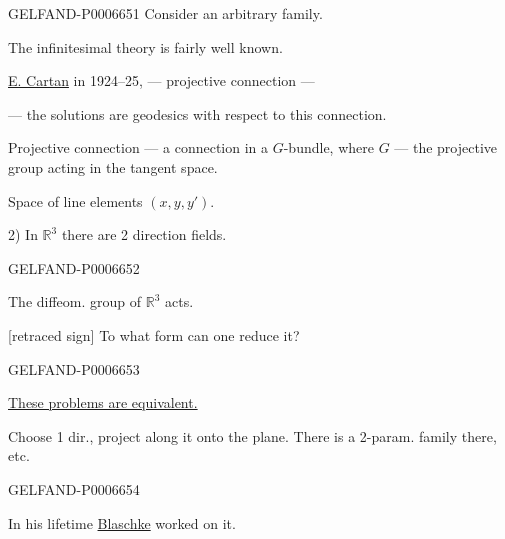 \begin{GelfandAdjacentEvidence}{GELFAND-P000665}{1}
Consider an arbitrary family.

The infinitesimal theory is fairly well known.

\underline{E. Cartan} in 1924–25, --- projective connection ---

--- the solutions are geodesics with respect to this connection.

Projective connection --- a connection in a \(G\)-bundle, where \(G\) --- the projective group acting in the tangent space.

Space of line elements \((x,y,y')\).

2) In \(\mathbb R^3\) there are 2 direction fields.
\end{GelfandAdjacentEvidence}
\begin{GelfandAdjacentEvidence}{GELFAND-P000665}{2}


The diffeom. group of \(\mathbb R^3\) acts.

[retraced sign] To what form can one reduce it?
\end{GelfandAdjacentEvidence}
\begin{GelfandAdjacentEvidence}{GELFAND-P000665}{3}


\underline{These problems are equivalent.}

Choose 1 dir., project along it onto the plane. There is a 2-param. family there, etc.
\end{GelfandAdjacentEvidence}
\begin{GelfandAdjacentEvidence}{GELFAND-P000665}{4}


In his lifetime \underline{Blaschke} worked on it.
\end{GelfandAdjacentEvidence}

